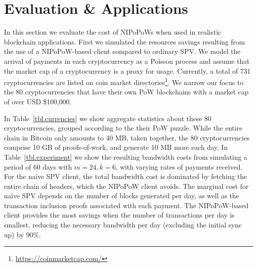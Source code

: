 \section{Evaluation \& Applications}
\label{sec:applications}
In this section we evaluate the cost of NIPoPoWs when used in realistic blockchain applications.
First we simulated the resources savings resulting from the use of a NIPoPoW-based
client compared to ordinary SPV. We model the arrival of payments in each cryptocurrency as a Poisson process
and assume that the market cap of a cryptocurrency is a proxy for usage. Currently,
a total of 731 cryptocurrencies are listed on coin market
directories\footnote{\url{https://coinmarketcap.com/}}. We narrow our focus to
the 80 cryptocurrencies that have their own PoW blockchains with
a market cap of over USD \$100,000.

In Table~\ref{tbl.currencies} we show aggregate statistics about these 80
cryptocurrencies, grouped according to the their PoW puzzle. While the entire
chain in Bitcoin only amounts to 40 MB, taken together, the 80 cryptocurrencies
comprise 10 GB of proofs-of-work, and generate 10 MB more each day. In
Table~\ref{tbl.experiment} we show the resulting bandwidth costs from simulating
a period of 60 days with $m=24, k=6$, with varying rates of payments received.
%
For the na\"ive SPV client, the total bandwidth cost is dominated by fetching
the entire chain of headers, which the NIPoPoW client avoids. The marginal
cost for na\"ive SPV depends on the number of blocks generated per day, as well
as the transaction inclusion proofs associated with each payment. The
NIPoPoW-based client provides the most savings when the number of transactions
per day is smallest, reducing the necessary bandwidth per day (excluding the
initial sync up) by 90\%.

